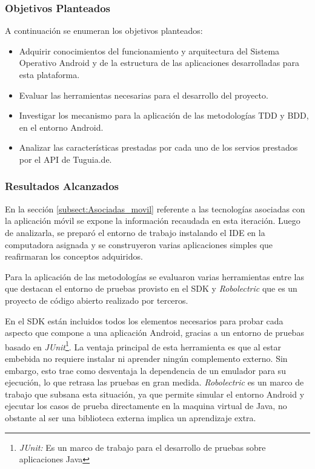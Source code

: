 \subsubsection{Objetivos Planteados}
A continuación se enumeran los objetivos planteados:

\begin{itemize}
\item Adquirir conocimientos del funcionamiento y arquitectura del Sistema Operativo Android y de la estructura de las aplicaciones desarrolladas para esta plataforma.
\item Evaluar las herramientas necesarias para el desarrollo del proyecto.
\item Investigar los mecanismo para la aplicación de las metodologías TDD y BDD, en el entorno Android.
\item Analizar las características prestadas por cada uno de los servios prestados por el API de Tuguia.de. 
\end{itemize}

\subsubsection{Resultados Alcanzados}

En la sección \ref{subsect:Asociadas_movil} referente a las tecnologías asociadas con la aplicación móvil se expone la información recaudada en esta iteración. Luego de analizarla, se preparó  el entorno de trabajo instalando el IDE en la computadora asignada y se  construyeron varias aplicaciones simples que reafirmaran los conceptos adquiridos.

Para la aplicación de las metodologías se evaluaron varias herramientas entre las que destacan el entorno de pruebas provisto en el SDK y \textit{Robolectric} que es un proyecto de código abierto realizado por terceros.

En el SDK están incluidos todos los elementos necesarios para probar cada aspecto que compone a una aplicación Android, gracias a un entorno de pruebas basado en \textit{JUnit}\footnote{\textit{JUnit:} Es un marco de trabajo para el desarrollo de pruebas sobre aplicaciones Java\cite{JUNIT}}. La ventaja principal de esta herramienta es que al estar embebida no requiere instalar ni aprender ningún complemento externo. Sin embargo, esto trae como desventaja la dependencia de un emulador para su ejecución, lo que retrasa las pruebas en gran medida. \textit{Robolectric} es un marco de trabajo que subsana esta situación, ya que permite simular el entorno Android y ejecutar los casos de prueba directamente en la maquina virtual de Java, no obstante al ser una biblioteca externa implica un aprendizaje extra.

